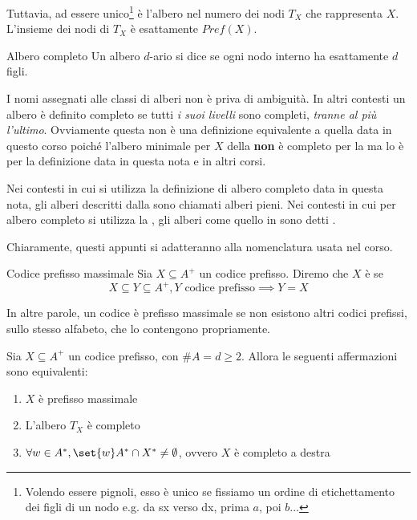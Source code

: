 Tuttavia, ad essere unico\footnote{Volendo essere pignoli, esso è unico se fissiamo un ordine di etichettamento dei figli di un nodo e.g. da sx verso dx, prima $a$, poi $b$...} è l'albero  nel numero dei nodi \(T_X\) che rappresenta \(X\).
L'insieme dei nodi di \(T_X\) è esattamente \(Pref(X)\).

\begin{definition}[label=def:complete_tree]{Albero completo}
  Un albero \(d\)-ario si dice  se ogni nodo interno ha esattamente \(d\) figli.
\end{definition}

\begin{note}{}
  I nomi assegnati alle classi di alberi non è priva di ambiguità.
  In altri contesti un albero è definito completo se tutti \textit{i suoi livelli} sono completi, \textit{tranne al più l'ultimo}.
  Ovviamente questa non è una definizione equivalente a quella data in questo corso poiché l'albero minimale per \(X\) della  \textbf{non} è completo per la  ma lo è per la definizione data in questa nota e in altri corsi.

  Nei contesti in cui si utilizza la definizione di albero completo data in questa nota, gli alberi descritti dalla  sono chiamati alberi pieni.
  Nei contesti in cui per albero completo si utilizza la , gli alberi come quello in  sono detti .

  Chiaramente, questi appunti si adatteranno alla nomenclatura usata nel corso.
\end{note}

\begin{definition}{Codice prefisso massimale}
  Sia \(X \subseteq A^+\) un codice prefisso. Diremo che \(X\) è  se
  \[X \subseteq Y \subseteq A^+, Y \text{ codice prefisso} \implies Y = X\]
\end{definition}
In altre parole, un codice è prefisso massimale se non esistono altri codici prefissi, sullo stesso alfabeto, che lo contengono propriamente. 

\begin{theorem}[label=thm:prefix_code_properties]{}
  Sia \(X \subseteq A^+\) un codice prefisso, con \(\# A = d \geq 2\). Allora le seguenti affermazioni sono equivalenti:
  \begin{enumerate}
    \item \(X\) è prefisso massimale
    \item L'albero \(T_X\) è completo
    \item \(\forall w \in A^*, \set{w}A^*\cap X^* \neq \emptyset\), ovvero \(X\) è completo a destra
  \end{enumerate}
\end{theorem}

